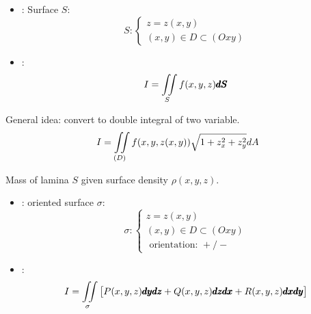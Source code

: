 \clearpage

\begin{multicols}{2}


      \begin{itemize}
        \item {}: Surface $S$:
          \begin{equation*}
            S:
              \begin{cases}
                z = z(x, y) \\
                (x, y) \in D \subset (Oxy)
              \end{cases}
          \end{equation*}
        \item {}:
          \begin{equation*}
            I = \iint \limits_{S} f(x, y, z)\pmb{dS}
          \end{equation*}
      \end{itemize}

      \par General idea: convert to double integral of two variable.
        \begin{equation}
          I = \iint \limits_{(D)} f(x, y, z(x, y)) \sqrt{1 + z_{x}^{2} + z_{y}^{2}} dA
        \end{equation}

        \par Mass of lamina $S$ given surface density $\rho(x, y, z)$.

      \begin{itemize}
        \item {}: oriented surface $\sigma$:
          \begin{equation*}
            \sigma:
              \begin{cases}
                z = z(x, y) \\
                (x, y) \in D \subset (Oxy) \\
                \mbox{ orientation: } +/-
              \end{cases}
          \end{equation*}
        \item {}:
          \begin{equation*}
            I = \iint \limits_{\sigma} \big[P(x, y, z)\pmb{dydz} + Q(x, y, z)\pmb{dzdx} + R(x, y, z)\pmb{dxdy}\big]
          \end{equation*}
      \end{itemize}


\end{multicols}
